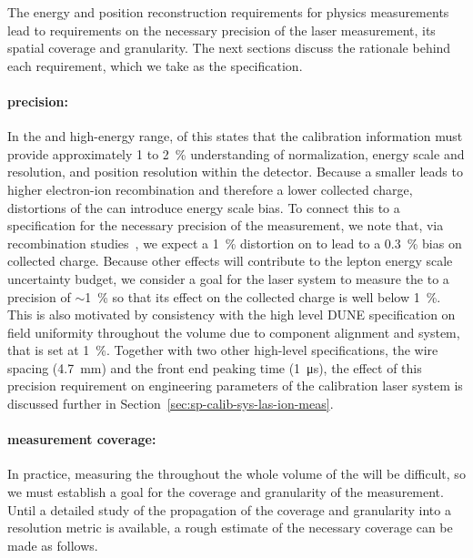 

The energy and position reconstruction requirements for physics measurements lead to requirements on the necessary precision of the laser %
\efield measurement, its spatial coverage and granularity. The next sections discuss the rationale behind each requirement, which we take as the  specification.

\paragraph{\efield precision:}


In the  and high-energy range, \physchlbl of this 
states that the calibration information must provide approximately \num{1} to \SI{2}{\%} understanding of normalization, energy scale and resolution, and position resolution within the detector.
Because a smaller \efield leads to higher electron-ion recombination and therefore a lower collected charge, distortions of the \efield can introduce
energy scale bias. To connect this
to a specification for the necessary precision of the \efield measurement, we note that, via recombination studies~\cite{bib:mooney2018}, we expect a \SI{1}{\%} distortion on \efield to lead to a \SI{0.3}{\%} bias on collected charge.
Because other effects will contribute to the lepton energy scale uncertainty budget, we consider a goal for the 
laser system to measure the \efield to a precision of $\sim$\SI{1}{\%} so that its effect on the collected charge is well below \SI{1}{\%}.
This is also motivated by consistency with the high level DUNE specification on field uniformity throughout the volume due to component alignment and  system, that 
is set at \SI{1}{\%}.
Together with two other high-level  specifications, the  wire spacing (\SI{4.7}{\mm}) and the front end peaking time (\SI{1}{\micro\s}), the effect of this \efield precision requirement on engineering parameters of the calibration laser system is discussed further %
in Section~\ref{sec:sp-calib-sys-las-ion-meas}.

\paragraph{\efield measurement coverage:}

In practice, measuring the \efield  throughout the whole volume of the  will be difficult, so we must establish a goal for the coverage and granularity of the measurement. 
Until a detailed study of the propagation of the coverage and granularity into a resolution metric is available, a rough estimate of the necessary coverage can be made as follows.

